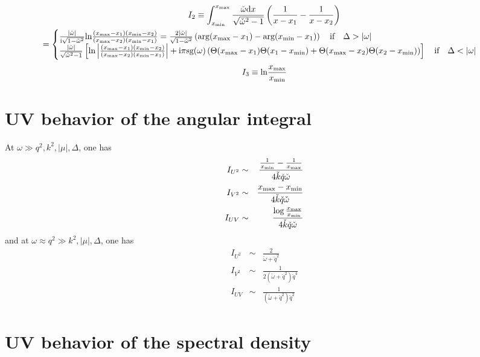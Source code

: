 \documentclass[10pt,a4paper,a4wide]{article}
\newcommand{\be}{\begin{equation}}
\newcommand{\ee}{\end{equation}}
\newcommand{\bea}{\begin{eqnarray}}
\newcommand{\eea}{\end{eqnarray}}
\newcommand{\ii}{\mathrm{i}}
\newcommand{\dd}{\mathrm{d}}
\newcommand{\bb}[1]{\left( #1 \right)}
\newcommand{\bbcro}[1]{\left[ #1 \right]}
\begin{document}
\begin{multline}
I_2\equiv \int_{x_{\rm min}}^{x_{\rm max}} \frac{\check\omega\dd x}{\sqrt{\check\omega^2-1}} \bb{\frac{1}{x-x_1}-\frac{1}{x-x_2}} \\ 
=\begin{cases} \frac{|\check\omega|}{\ii\sqrt{1-\check\omega^2}} \text{ln} {\frac{(x_{\rm max}-x_1)(x_{\rm min}-x_2)}{(x_{\rm max}-x_2)(x_{\rm min}-x_1)}}= \frac{2|\check\omega|}{\sqrt{1-\check\omega^2}}\bb{\text{arg}(x_{\rm max}-x_1)-\text{arg}(x_{\rm min}-x_1)} \quad  \text{if} \quad \Delta>|\omega| \\
 \frac{|\check\omega|}{\sqrt{\check\omega^2-1}} \bbcro{\text{ln} \left\vert{\frac{(x_{\rm max}-x_1)(x_{\rm min}-x_2)}{(x_{\rm max}-x_2)(x_{\rm min}-x_1)}}\right\vert +\ii\pi \text{sg}(\omega) \bb{\Theta(x_{\rm max}-x_1)\Theta(x_1-x_{\rm min})+\Theta(x_{\rm max}-x_2)\Theta(x_2-x_{\rm min})}}\quad  \text{if} \quad  \Delta<|\omega|
\end{cases}
\end{multline}
\be
I_3\equiv\text{ln}\frac{x_{\rm max}}{x_{\rm min}}
\ee

\section{UV behavior of the angular integral}

At $\omega\gg q^2,k^2,|\mu|,\Delta$, one has
\bea
I_{U^2}&\sim& \frac{{\frac{1}{x_{\rm min}}-\frac{1}{x_{\rm max}}}}{4\check k \check q \check \omega}\\
I_{V^2}&\sim& \frac{{x_{\rm max}-x_{\rm min}}}{4\check k \check q \check \omega} \\
I_{UV}&\sim& \frac{\log\frac{x_{\rm max}}{x_{\rm min}}}{4\check k \check q \check \omega} 
\eea
and at $\omega\approx q^2\gg k^2,|\mu|,\Delta$, one has
\bea
I_{U^2}&\sim& \frac{2}{\check \omega+\check q^2}\\
I_{V^2}&\sim& \frac{1}{2(\check \omega+\check q^2)\check q^4} \\
I_{UV}&\sim& \frac{1}{(\check \omega+\check q^2)\check q^2} 
\eea
\section{UV behavior of the spectral density}
\end{document}
